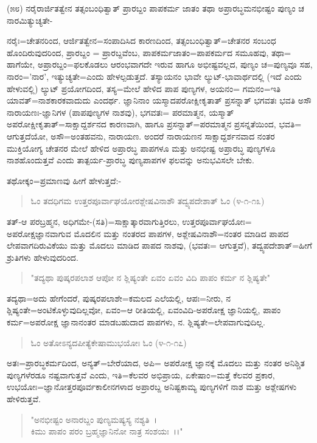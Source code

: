 (೫೮) ನರೈರಾರ್ಜಿತತ್ವೇನ ತತ್ಸಂಬಂಧಿತ್ವಾತ್ ಪ್ರಾರಬ್ದಂ ಪಾಪಕರ್ಮ ಜಾತಂ ತಥಾ ಅಪ್ರಾರಬ್ಧಮನಭೀಷ್ಟಂ ಪುಣ್ಯಂ ಚ ನಾರಮಿತ್ಯುಚ್ಯತೇ-

ನರೈಃ=ಚೇತನರಿಂದ, ಆರ್ಜಿತತ್ವೇನ=ಸಂಪಾದಿಸಿದ ಕಾರಣದಿಂದ, ತತ್ಸಂಬಂಧಿತ್ವಾತ್=ಚೇತನರ ಸಂಬಂಧ ಹೊಂದಿರುವುದರಿಂದ, ಪ್ರಾರಬ್ದಂ = ಪ್ರಾರಬ್ದವೆಂಬ, ಪಾಪಕರ್ಮಜಾತಂ=ಪಾಪಕರ್ಮದ ಸಮೂಹವು, ತಥಾ= ಹಾಗೆಯೇ, ಅಪ್ರಾರಬ್ದಂ=ಫಲಕೊಡಲು ಆರಂಭವಾಗದೇ ಇರುವ ಹಾಗೂ ಅಭೀಷ್ಟವಲ್ಲದ, ಪುಣ್ಯಂ ಚ=ಪುಣ್ಯವೂ ಸಹ, ನಾರಂ='ನಾರ', ಇತ್ಯುಚ್ಯತೇ=ಎಂದು ಹೇಳಲ್ಪಡುತ್ತದೆ. ತಸ್ಯಾಯನಂ ಭಾವೇ ಲ್ಯುಟ್-ಭಾವಾರ್ಥದಲ್ಲಿ (ಇದೆ ಎಂದು ಹೇಳುವಲ್ಲಿ) ಲ್ಯುಟ್ ಪ್ರಯೋಗದಿಂದ, ತಸ್ಯ=ಮೇಲೆ ಹೇಳಿದ ಪಾಪ ಪುಣ್ಯಗಳ, ಅಯನಂ= ಗಮನಂ=ಇತಿ ಯಾವತ್=ನಾಶಕಾರಕವಾದುದು ಎಂದರ್ಥ. ಜ್ಞಾನಿನಾಂ ಯಸ್ಮಾದಪರೋಕ್ಷೀಕೃತಾತ್ ಪ್ರಸನ್ನಾತ್ ಭಗವತಃ ಭವತಿ ಅಸೌ ನಾರಾಯಣಃ-ಜ್ಞಾನಿಗಳ (ಪಾಪಪುಣ್ಯಗಳ ನಾಶವು), ಭಗವತಃ= ಪರಮಾತ್ಮನ, ಯಸ್ಮಾತ್ ಅಪರೋಕ್ಷೀಕೃತಾತ್=ಸಾಕ್ಷಾದ್ದರ್ಶನದ ಕಾರಣವಾಗಿ, ಹಾಗೂ ಪ್ರಸನ್ನಾತ್=ಪರಮಾತ್ಮನ ಪ್ರಸನ್ನತೆಯಿಂದ, ಭವತಿ= ಆಗುತ್ತದೆಯೋ, ಅಸೌ=ಅಂತಹವನು, ನಾರಾಯಣ. ಅಂದರೆ ನಾರಾಯಣನ ಸಾಕ್ಷಾದ್ದರ್ಶನವಾದ ನಂತರ ಮುಕ್ತಿಯೋಗ್ಯ ಚೇತನರ ಮೇಲೆ ಹೇಳಿದ ಅಪ್ರಾರಬ್ಧ ಪಾಪಗಳೂ ಮತ್ತು ಅನಭೀಷ್ಟ ಅಪ್ರಾರಬ್ಧ ಪುಣ್ಯಗಳೂ ನಾಶಹೊಂದುತ್ತವೆ ಎಂದು ತಾತ್ಪರ್ಯ-ಪ್ರಾರಬ್ಧ ಪುಣ್ಯಪಾಪಗಳ ಫಲವನ್ನು ಅನುಭವಿಸಲೇ ಬೇಕು.

ತಥೋಕ್ಕಂ=ಪ್ರಮಾಣವು ಹೀಗೆ ಹೇಳುತ್ತದೆ:-

\begin{verse}
ಓಂ ತದಧಿಗಮ ಉತ್ತರಪೂರ್ವಾಘಯೋರಶ್ಲೇಷವಿನಾಶೌ‌ ತದ್ವ್ಯಪದೇಶಾತ್ ಓಂ (೪-೧-೧೩)
\end{verse}

ತತ್-ಆ ಪರಬ್ರಹ್ಮನ, ಅಧಿಗಮೇ-(ಸತಿ)=ಸಾಕ್ಷಾತ್ಕಾರವಾಗುತ್ತಿರಲು, ಉತ್ತರಪೂರ್ವಾಘಯೋಃ= ಅಪರೋಕ್ಷಜ್ಞಾನವಾಗುವ ಮೊದಲಿನ ಮತ್ತು ನಂತರದ ಪಾಪಗಳ, ಅಶ್ಲೇಷವಿನಾಶೌ=ನಂತರ ಮಾಡಿದ ಪಾಪದ ಲೇಪವಾಗದಿರುವಿಕೆಯು ಮತ್ತು ಮೊದಲು ಮಾಡಿದ ಪಾಪದ ನಾಶವು, (ಭವತಃ= ಆಗುತ್ತವೆ), ತದ್ವ್ಯಪದೇಶಾತ್=ಹೀಗೆ ಶ್ರುತಿಗಳು ಹೇಳುವುದರಿಂದ.

\begin{verse}
"ತದ್ಯಥಾ ಪುಷ್ಕರಪಲಾಶ ಆಪೋ ನ ಶ್ಲಿಷ್ಯಂತೇ ಏವಂ ಏವಂ ವಿದಿ ಪಾಪಂ ಕರ್ಮ ನ ಶ್ಲಿಷ್ಯತೇ"
\end{verse}

ತದ್ಯಥಾ=ಅದು ಹೇಗೆಂದರೆ, ಪುಷ್ಕರಪಲಾಶೇ=ಕಮಲದ ಎಲೆಯಲ್ಲಿ, ಆಪಃ=ನೀರು, ನ ಶ್ಲಿಷ್ಯಂತೇ=ಅಂಟಿಕೊಳ್ಳುವುದಿಲ್ಲವೋ, ಏವಂ=ಆ ರೀತಿಯಲ್ಲಿ, ಏವಂವಿದಿ-ಅಪರೋಕ್ಷ ಜ್ಞಾನಿಯಲ್ಲಿ, ಪಾಪಂ ಕರ್ಮ=ಅಪರೋಕ್ಷ ಜ್ಞಾನಾನಂತರ ಮಾಡಬಹುದಾದ ಪಾಪಗಳು, ನ. ಶ್ಲಿಷ್ಯತೇ=ಲೇಪವಾಗುವುದಿಲ್ಲ.

\begin{verse}
ಓಂ ಅತೋಽನ್ಯದಪೀತ್ಯೆಕೇಷಾಮುಭಯೋಃ ಓಂ (೪-೧-೧೭)
\end{verse}

ಅತಃ=ಪ್ರಾರಬ್ಧಕರ್ಮದಿಂದ, ಅನ್ಯತ್=ಬೇರೆಯಾದ, ಅಪಿ= ಅಪರೋಕ್ಷ ಜ್ಞಾನಕ್ಕೆ ಮೊದಲು ಮತ್ತು ನಂತರ ಅನಿಶ್ಚಿತ ಪುಣ್ಯಗಳೆರಡೂ ನಷ್ಟವಾಗುತ್ತವೆ ಎಂದು, ಇತಿ=ಕೆಲವರ ಅಭಿಪ್ರಾಯ, ಏಕೇಷಾಂ=ಮತ್ತೆ ಕೆಲವರ ಪ್ರಕಾರ, ಉಭಯೋಃ=ಜ್ಞಾನೋತ್ತರಪೂರ್ವಕಾಲೀನಗಳಾದ ಅಪ್ರಾರಬ್ದ ಅನಿಷ್ಟಕಾಮ್ಯ ಪುಣ್ಯಗಳಿಗೆ ನಾಶ ಮತ್ತು ಅಶ್ಲೇಷಗಳು ಹೇಳಿರುತ್ತವೆ.

\begin{verse}
"ಅನಭೀಷ್ಟಂ ಅನಾರಬ್ದಂ ಪುಣ್ಯಮಷ್ಯಸ್ಯ ನಶ್ಯತಿ~।\\ ಕಿಮು ಪಾಪಂ ಪರಂ ಬ್ರಹ್ಮಜ್ಞಾನಿನೋ ನಾತ್ರ ಸಂಶಯಃ~।।"
\end{verse}

